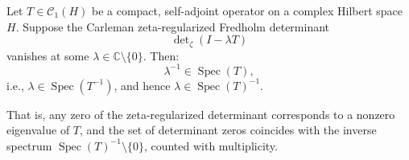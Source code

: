 \begin{lemma}
\label{lem:det_zero_implies_spectrum}
Let \( T \in \mathcal{C}_1(H) \) be a compact, self-adjoint operator on a complex Hilbert space \( H \). Suppose the Carleman zeta-regularized Fredholm determinant
\[
\det\nolimits_{\zeta}(I - \lambda T)
\]
vanishes at some \( \lambda \in \mathbb{C} \setminus \{0\} \). Then:
\[
\lambda^{-1} \in \operatorname{Spec}(T),
\]
i.e., \( \lambda \in \operatorname{Spec}(T^{-1}) \), and hence \( \lambda \in \operatorname{Spec}(T)^{-1} \).

\medskip
\noindent
That is, any zero of the zeta-regularized determinant corresponds to a nonzero eigenvalue of \( T \), and the set of determinant zeros coincides with the inverse spectrum \( \operatorname{Spec}(T)^{-1} \setminus \{0\} \), counted with multiplicity.
\end{lemma}
